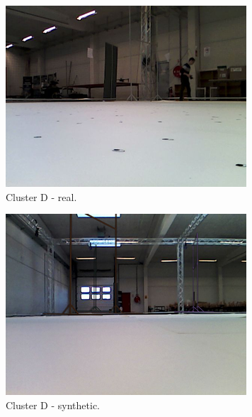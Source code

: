 \begin{figure}[h!]
   \centering
   \begin{subfigure}{0.32\textwidth}
      \includegraphics[width=\textwidth]{figure/tsne_random/D/8.png}
      \caption{Cluster D - real.}
   \end{subfigure}
   \begin{subfigure}{0.32\textwidth}
      \includegraphics[width=\textwidth]{figure/tsne_random/D/9.png}
      \caption{Cluster D - synthetic.}
   \end{subfigure}
   \begin{subfigure}{0.32\textwidth}

\end{subfigure}
\end{figure}
